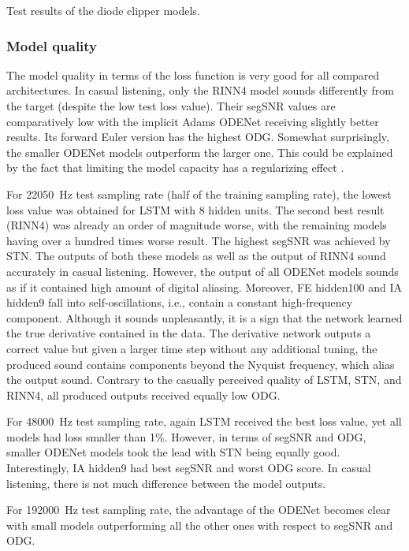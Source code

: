 
\begin{table}[]
    \caption{Test results of the diode clipper models.}
    
    \label{tab:diode_clipper_results}
\end{table}

\subsubsection{Model quality}

The model quality in terms of the loss function is very good for all compared architectures. In casual listening, only the \ac{RINN}4 model sounds differently from the target (despite the low test loss value). Their \ac{segSNR} values are comparatively low with the implicit Adams ODENet receiving slightly better results. Its forward Euler version has the highest \ac{ODG}. Somewhat surprisingly, the smaller ODENet models outperform the larger one. This could be explained by the fact that limiting the model capacity has a regularizing effect \cite{Goodfellow-et-al-2016}.

For \SI{22050}{Hz} test sampling rate (half of the training sampling rate), the lowest loss value was obtained for \ac{LSTM} with 8 hidden units. The second best result (\ac{RINN}4) was already an order of magnitude worse, with the remaining models having over a hundred times worse result. The highest \ac{segSNR} was achieved by \ac{STN}. The outputs of both these models as well as the output of \ac{RINN}4 sound accurately in casual listening. However, the output of all ODENet models sounds as if it contained high amount of digital aliasing. Moreover, FE hidden100 and IA hidden9 fall into self-oscillations, i.e., contain a constant high-frequency component. Although it sounds unpleasantly, it is a sign that the network learned the true derivative contained in the data. The derivative network outputs a correct value but given a larger time step without any additional tuning, the produced sound contains components beyond the Nyquist frequency, which alias the output sound. Contrary to the casually perceived quality of \ac{LSTM}, \ac{STN}, and \ac{RINN}4, all produced outputs received equally low \ac{ODG}. 

For \SI{48000}{Hz} test sampling rate, again \ac{LSTM} received the best loss value, yet all models had loss smaller than 1\%. However, in terms of \ac{segSNR} and \ac{ODG}, smaller ODENet models took the lead with \ac{STN} being equally good. Interestingly, IA hidden9 had best \ac{segSNR} and worst \ac{ODG} score. In casual listening, there is not much difference between the model outputs.

For \SI{192000}{Hz} test sampling rate, the advantage of the ODENet becomes clear with small models outperforming all the other ones with respect to \ac{segSNR} and \ac{ODG}. 
